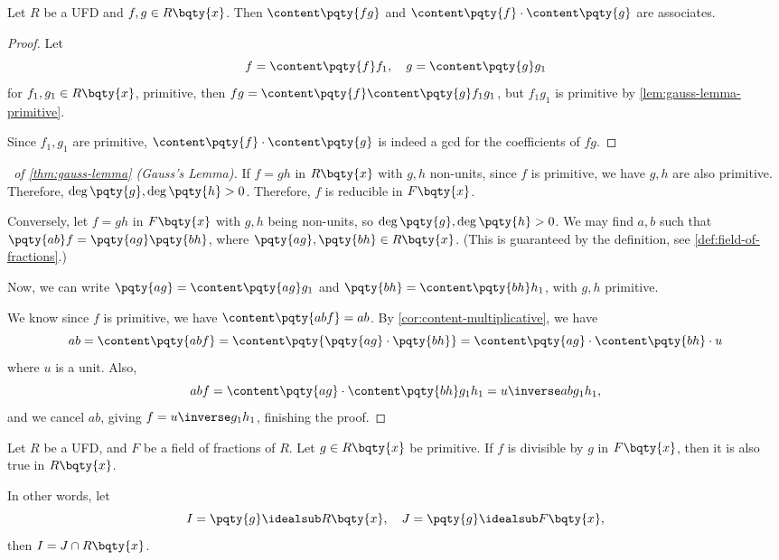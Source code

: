 \begin{corollary}
    \label{cor:content-multiplicative}%
    Let \(R\) be a UFD and \(f, g \in R\bqty{x}\). Then \(\content\pqty{fg}\) and \(\content\pqty{f} \cdot \content\pqty{g}\) are associates.
\end{corollary}

\begin{proof}
    Let
    \[
        f = \content\pqty{f} f_1, \quad g = \content\pqty{g} g_1
    \]
    for \(f_1, g_1 \in R\bqty{x}\), primitive, then \(fg = \content\pqty{f} \content\pqty{g} f_1 g_1\), but \(f_1 g_1\) is primitive by \autoref{lem:gauss-lemma-primitive}.

    Since \(f_1, g_1\) are primitive, \(\content\pqty{f} \cdot \content\pqty{g}\) is indeed a gcd for the coefficients of \(fg\).
\end{proof}

\begin{proof}[\proofname\ of \autoref{thm:gauss-lemma} (Gauss's Lemma)]
    If \(f = gh\) in \(R\bqty{x}\) with \(g, h\) non-units, since \(f\) is primitive, we have \(g, h\) are also primitive. Therefore, \(\deg \pqty{g}, \deg\pqty{h} > 0\). Therefore, \(f\) is reducible in \(F\bqty{x}\).

    Conversely, let \(f = gh\) in \(F\bqty{x}\) with \(g, h\) being non-units, so \(\deg\pqty{g}, \deg\pqty{h} > 0\). We may find \(a, b\) such that \(\pqty{ab}f = \pqty{ag} \pqty{bh}\), where \(\pqty{ag}, \pqty{bh} \in R\bqty{x}\). (This is guaranteed by the definition, see \autoref{def:field-of-fractions}.)

    Now, we can write \(\pqty{ag} = \content\pqty{ag} g_1\) and \(\pqty{bh} = \content\pqty{bh} h_1\), with \(g, h\) primitive.

    We know since \(f\) is primitive, we have \(\content\pqty{abf} = ab\). By \autoref{cor:content-multiplicative}, we have
    \[
        ab = \content\pqty{abf} = \content\pqty{\pqty{ag} \cdot \pqty{bh}} = \content\pqty{ag} \cdot \content\pqty{bh} \cdot u
    \]
    where \(u\) is a unit. Also,
    \[
        abf = \content\pqty{ag} \cdot \content\pqty{bh} g_1 h_1 = u\inverse ab g_1 h_1,
    \]
    and we cancel \(ab\), giving \(f = u\inverse g_1 h_1\), finishing the proof.
\end{proof}

\begin{proposition}
    \label{prop:divisibility-polynomial-ring-fof}%
    Let \(R\) be a UFD, and \(F\) be a field of fractions of \(R\). Let \(g \in R\bqty{x}\) be primitive. If \(f\) is divisible by \(g\) in \(F\bqty{x}\), then it is also true in \(R\bqty{x}\).

    In other words, let
    \[
        I = \pqty{g} \idealsub R\bqty{x}, \quad J = \pqty{g} \idealsub F\bqty{x},
    \]
    then \(I = J \cap R\bqty{x}\).
\end{proposition}

